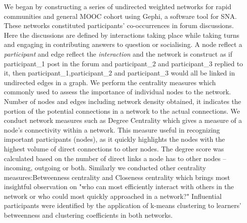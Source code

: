 \documentclass[manuscript,screen,review]{acmart}
\begin{document}
We began by constructing a series of undirected weighted networks for rapid communities and general MOOC cohort using Gephi, a software tool for SNA. These networks constituted participants’ co-occurrences in forum discussions. Here the discussions are defined by interactions taking place  while taking turns and engaging in contributing answers to question or socialising. A node reflect a \textit{participant} and edge reflect the \textit{interaction} and the network is construct as if participant\_1 post in the forum and participant\_2 and participant\_3 replied to it, then participant\_1,participant\_2 and participant\_3 would all be linked in undirected edges in a graph. We perform the centrality measures which commonly used to assess the importance of individual nodes to the network. Number of nodes and edges including network density obtained, it indicates the portion of the potential connections in a network to the actual connections. We conduct network measures such as Degree Centrality which gives a measure of a node’s connectivity within a network. This measure useful in recognizing important participants (nodes), as it quickly highlights the nodes with the highest volume of direct connections to other nodes. The degree score was calculated based on the number of direct links a node has to other nodes – incoming, outgoing or both. Similarly we conducted other centrality measures:Betweenness centrality and Closeness centrality which brings most insightful observation on "who can most efficiently interact with others in the network or who could most quickly approached in a network?" Influential participants were identified by the application of k-means clustering to learners’ betweenness and clustering coefficients in both networks.  


 
\end{document}

